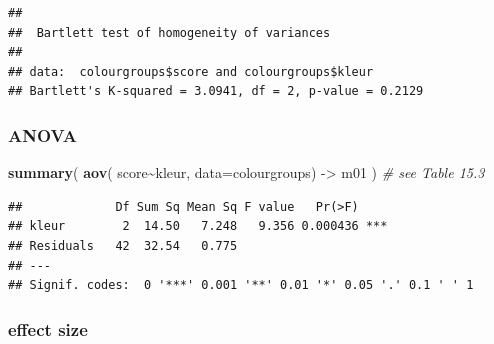 \documentclass[
]{book}
\newenvironment{Shaded}{\begin{snugshade}}{\end{snugshade}}
\newcommand{\CommentTok}[1]{\textcolor[rgb]{0.56,0.35,0.01}{\textit{#1}}}
\newcommand{\DataTypeTok}[1]{\textcolor[rgb]{0.13,0.29,0.53}{#1}}
\newcommand{\KeywordTok}[1]{\textcolor[rgb]{0.13,0.29,0.53}{\textbf{#1}}}
\newcommand{\NormalTok}[1]{#1}
\newcommand{\OperatorTok}[1]{\textcolor[rgb]{0.81,0.36,0.00}{\textbf{#1}}}
\newcommand{\StringTok}[1]{\textcolor[rgb]{0.31,0.60,0.02}{#1}}
\begin{document}
\begin{Shaded}
\end{Shaded}

\begin{verbatim}
## 
##  Bartlett test of homogeneity of variances
## 
## data:  colourgroups$score and colourgroups$kleur
## Bartlett's K-squared = 3.0941, df = 2, p-value = 0.2129
\end{verbatim}

\hypertarget{anova-2}{%
\subsubsection{ANOVA}\label{anova-2}}

\begin{Shaded}
\begin{Highlighting}[]
\KeywordTok{summary}\NormalTok{( }\KeywordTok{aov}\NormalTok{( score}\OperatorTok{\textasciitilde{}}\NormalTok{kleur, }\DataTypeTok{data=}\NormalTok{colourgroups) {-}\textgreater{}}\StringTok{ }\NormalTok{m01 ) }\CommentTok{\# see Table 15.3}
\end{Highlighting}
\end{Shaded}

\begin{verbatim}
##             Df Sum Sq Mean Sq F value   Pr(>F)    
## kleur        2  14.50   7.248   9.356 0.000436 ***
## Residuals   42  32.54   0.775                     
## ---
## Signif. codes:  0 '***' 0.001 '**' 0.01 '*' 0.05 '.' 0.1 ' ' 1
\end{verbatim}

\hypertarget{R:omega-square}{%
\subsubsection{effect size}\label{R:omega-square}}
\end{document}
